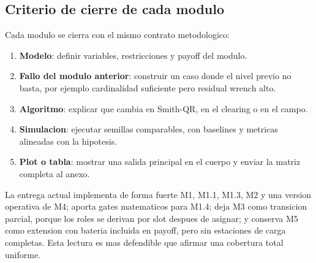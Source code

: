 \subsection{Criterio de cierre de cada modulo}

Cada modulo se cierra con el mismo contrato metodologico:
\begin{enumerate}[leftmargin=2em]
  \item \textbf{Modelo}: definir variables, restricciones y payoff del modulo.
  \item \textbf{Fallo del modulo anterior}: construir un caso donde el nivel previo no
  basta, por ejemplo cardinalidad suficiente pero residual wrench alto.
  \item \textbf{Algoritmo}: explicar que cambia en Smith-QR, en el clearing o en el campo.
  \item \textbf{Simulacion}: ejecutar semillas comparables, con baselines y metricas
  alineadas con la hipotesis.
  \item \textbf{Plot o tabla}: mostrar una salida principal en el cuerpo y enviar la
  matriz completa al anexo.
\end{enumerate}

La entrega actual implementa de forma fuerte M1, M1.1, M1.3, M2 y una version operativa
de M4; aporta gates matematicos para M1.4; deja M3 como transicion parcial, porque los
roles se derivan por slot despues de asignar; y conserva M5 como extension con bateria
incluida en payoff, pero sin estaciones de carga completas. Esta lectura es mas
defendible que afirmar una cobertura total uniforme.
